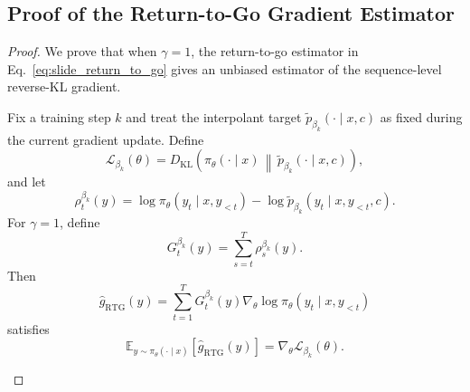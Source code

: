 \subsection{Proof of the Return-to-Go Gradient Estimator}
\label{app:onpolicy-lookahead-gradient}
\begin{proof}
We prove that when $\gamma=1$, the return-to-go estimator in
Eq.~\ref{eq:slide_return_to_go} gives an unbiased estimator of the sequence-level
reverse-KL gradient.

\begin{proposition}
\label{prop:rtg_unbiased_beta_opsd}
Fix a training step $k$ and treat the interpolant target
$\tilde p_{\beta_k}(\cdot\mid x,c)$ as fixed during the current gradient update. Define
\begin{equation}
    \mathcal{L}_{\beta_k}(\theta)
    =
    D_{\mathrm{KL}}
    \left(
    \pi_\theta(\cdot\mid x)
    \,\middle\|\,
    \tilde p_{\beta_k}(\cdot\mid x,c)
    \right),
\end{equation}
and let
\begin{equation}
    \rho_t^{\beta_k}(y)
    =
    \log \pi_\theta(y_t\mid x,y_{<t})
    -
    \log \tilde p_{\beta_k}(y_t\mid x,y_{<t},c).
\end{equation}
For $\gamma=1$, define
\begin{equation}
    G_t^{\beta_k}(y)
    =
    \sum_{s=t}^{T}
    \rho_s^{\beta_k}(y).
\end{equation}
Then
\begin{equation}
    \widehat{g}_{\mathrm{RTG}}(y)
    =
    \sum_{t=1}^{T}
    G_t^{\beta_k}(y)
    \nabla_\theta
    \log \pi_\theta(y_t\mid x,y_{<t})
\end{equation}
satisfies
\begin{equation}
    \mathbb{E}_{y\sim \pi_\theta(\cdot\mid x)}
    \left[
    \widehat{g}_{\mathrm{RTG}}(y)
    \right]
    =
    \nabla_\theta
    \mathcal{L}_{\beta_k}(\theta).
\end{equation}
\end{proposition}


\end{proof}
